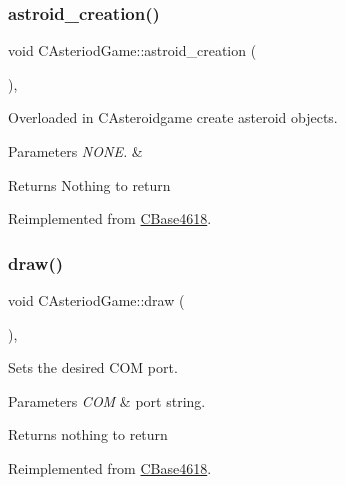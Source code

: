 \subsubsection{\texorpdfstring{astroid\+\_\+creation()}{astroid\_creation()}}
{\footnotesize\ttfamily void C\+Asteriod\+Game\+::astroid\+\_\+creation (\begin{DoxyParamCaption}{ }\end{DoxyParamCaption})\hspace{0.3cm}{\ttfamily [override]}, {\ttfamily [virtual]}}



Overloaded in C\+Asteroidgame create asteroid objects. 


\begin{DoxyParams}{Parameters}
{\em N\+O\+N\+E.} & \\
\hline
\end{DoxyParams}
\begin{DoxyReturn}{Returns}
Nothing to return 
\end{DoxyReturn}


Reimplemented from \hyperlink{class_c_base4618_a30aae55b21db35e1d70b04659a0feeb9}{C\+Base4618}.

\hypertarget{class_c_asteriod_game_a6c14d9f6671a0789b5738cdb5bc0af3a}{}\label{class_c_asteriod_game_a6c14d9f6671a0789b5738cdb5bc0af3a} 
\subsubsection{\texorpdfstring{draw()}{draw()}}
{\footnotesize\ttfamily void C\+Asteriod\+Game\+::draw (\begin{DoxyParamCaption}{ }\end{DoxyParamCaption})\hspace{0.3cm}{\ttfamily [override]}, {\ttfamily [virtual]}}



Sets the desired C\+OM port. 


\begin{DoxyParams}{Parameters}
{\em C\+OM} & port string. \\
\hline
\end{DoxyParams}
\begin{DoxyReturn}{Returns}
nothing to return 
\end{DoxyReturn}


Reimplemented from \hyperlink{class_c_base4618_a853327d563d064bb31db241861c4d291}{C\+Base4618}.

